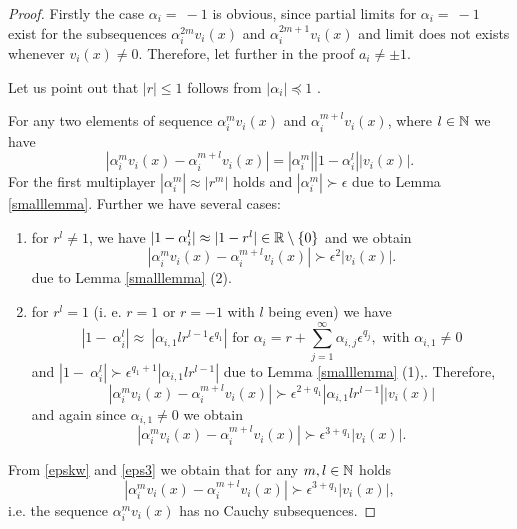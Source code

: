 \documentclass[a4paper,12pt]{amsart}
\theoremstyle{definition}
\begin{document}
\begin{proof}
Firstly the case $\alpha_i=~-1$ is obvious, since partial limits for $\alpha_i=~-1$ exist for the subsequences $\mathcal \alpha_{i}^{2m} v_{i}(x)$ and $\mathcal \alpha_{i}^{2m+1} v_{i}(x)$ and limit does not exists whenever $v_i(x)\ne 0$. Therefore, let further in the proof $a_i\ne \pm 1$.

Let us point out that $|r|\le 1$ follows from  $|\alpha_{i}|\preceq 1$ .

For any two elements of sequence $\alpha_{i}^{m} v_{i}(x)$ and $\alpha_{i}^{m+l} v_{i}(x)$, where $l\in \Bbb N$
we have
\begin{equation*}
|\alpha_{i}^{m} v_{i}(x)-\alpha_{i}^{m+l} v_{i}(x)|=|\alpha_{i}^{m}||1-\alpha_{i}^l|| v_{i}(x)|.%
\end{equation*}
For the first multiplayer $|\alpha_i^{m}|\approx |r^m|$ holds and $|\alpha_i^{m}|\succ \epsilon$ due to Lemma \ref{smalllemma}. Further we have several cases:
\begin{enumerate}
\item
for $r^l\ne 1$, we have  $|1-\alpha_{i}^l|\approx |1- r^l|\in \Bbb R\setminus\{0\}$ and we obtain 
\begin{equation}\label{epskw}
|\alpha_{i}^{m} v_{i}(x)-\alpha_{i}^{m+l} v_{i}(x)|\succ{\epsilon}^2| v_{i}(x)|.
\end{equation}
due to Lemma \ref{smalllemma} (2).
\item
for $r^l=1$ (i. e. $r=1$  or $r=-1$ with $l$ being even) we have 
$$
|1-~\alpha_{i}^l|\approx~|\alpha_{i,1}lr^{l-1}\epsilon^{q_1}| \mbox{ for }
\alpha_{i}=r+\sum_{j=1}^\infty\alpha_{i,j}\epsilon ^{q_j}, \mbox{ with } \alpha_{i,1}\ne 0
$$
and
$|1-~\alpha_{i}^l|\succ\epsilon^{q_1+1} |\alpha_{i,1}lr^{l-1}|$ due to Lemma \ref{smalllemma} (1),. Therefore,
$$
|\alpha_{i}^{m} v_{i}(x)-\alpha_{i}^{m+l} v_{i}(x)|\succ{\epsilon}^{2+q_1}|\alpha_{i,1}lr^{l-1}|| v_{i}(x)|
$$ 
and again since $\alpha_{i,1}\ne 0$ we obtain
\begin{equation}\label{eps3}
|\alpha_{i}^{m} v_{i}(x)-\alpha_{i}^{m+l} v_{i}(x)|\succ{\epsilon}^{3+q_1}| v_{i}(x)|.
\end{equation}
\end{enumerate}
From \eqref{epskw} and \eqref{eps3} we obtain that for any $m, l\in\Bbb N$ holds
$$
|\alpha_{i}^{m} v_{i}(x)-\alpha_{i}^{m+l} v_{i}(x)|\succ{\epsilon}^{3+q_1}| v_{i}(x)|,
$$ 
i.e. the sequence $\alpha_{i}^{m} v_{i}(x)$ has no Cauchy subsequences.
\end{proof}
\end{document}
